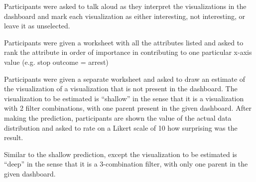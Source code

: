  Participants were asked to talk aloud as they interpret the visualizations in the dashboard and mark each visualization as either interesting, not interesting, or leave it as unselected.

 Participants were given a worksheet with all the attributes listed and asked to rank the attribute in order of importance in contributing to one particular x-axis value (e.g. stop outcome = arrest)

 Participants were given a separate worksheet and asked to draw an estimate of the visualization of a visualization that is not present in the dashboard. The visualization to be estimated is ``shallow'' in the sense that it is a visualization with 2 filter combinations, with one parent present in the given dashboard. After making the prediction, participants are shown the value of the actual data distribution and asked to rate on a Likert scale of 10 how surprising was the result.

 Similar to the shallow prediction, except the visualization to be estimated is ``deep'' in the sense that it is a 3-combination filter, with only one parent in the given dashboard. 

